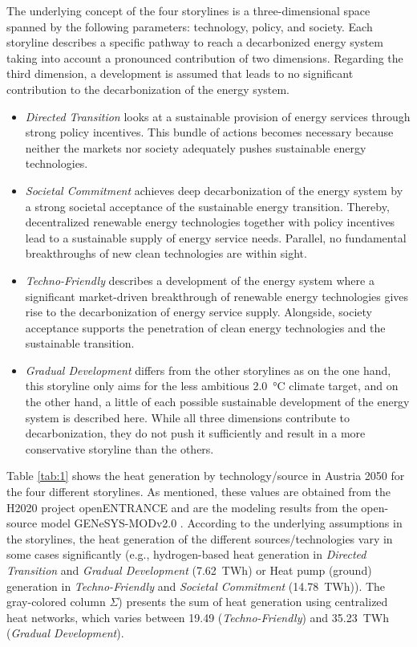 The underlying concept of the four storylines is a three-dimensional space spanned by the following parameters: technology, policy, and society. Each storyline describes a specific pathway to reach a decarbonized energy system taking into account a pronounced contribution of two dimensions. Regarding the third dimension, a development is assumed that leads to no significant contribution to the decarbonization of the energy system. 

\begin{itemize}
	\item \textit{Directed Transition} looks at a sustainable provision of energy services through strong policy incentives. This bundle of actions becomes necessary because neither the markets nor society adequately pushes sustainable energy technologies.
	\item \textit{Societal Commitment} achieves deep decarbonization of the energy system by a strong societal acceptance of the sustainable energy transition. Thereby, decentralized renewable energy technologies together with policy incentives lead to a sustainable supply of energy service needs. Parallel, no fundamental breakthroughs of new clean technologies are within sight.
	\item \textit{Techno-Friendly} describes a development of the energy system where a significant market-driven breakthrough of renewable energy technologies gives rise to the decarbonization of energy service supply. Alongside, society acceptance supports the penetration of clean energy technologies and the sustainable transition.
	\item \textit{Gradual Development} differs from the other storylines as on the one hand, this storyline only aims for the less ambitious \SI{2.0}{\degreeCelsius} climate target, and on the other hand, a little of each possible sustainable development of the energy system is described here. While all three dimensions contribute to decarbonization, they do not push it sufficiently and result in a more conservative storyline than the others.
\end{itemize}

Table \ref{tab:1} shows the heat generation by technology/source in Austria 2050 for the four different storylines. As mentioned, these values are obtained from the H2020 project openENTRANCE and are the modeling results from the open-source model GENeSYS-MODv2.0 \cite{burandt2018genesys}. According to the underlying assumptions in the storylines, the heat generation of the different sources/technologies vary in some cases significantly (e.g., hydrogen-based heat generation in \textit{Directed Transition} and \textit{Gradual Development} (\SI{7.62}{TWh}) or Heat pump (ground) generation in \textit{Techno-Friendly} and \textit{Societal Commitment} (\SI{14.78}{TWh})). The gray-colored column $\Sigma$) presents the sum of heat generation using centralized heat networks, which varies between \SI{19.49}{} (\textit{Techno-Friendly}) and \SI{35.23}{TWh} (\textit{Gradual Development}).

